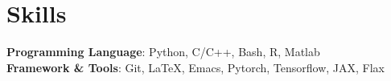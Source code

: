 \documentclass[letterpaper,11pt]{article}
\begin{document}
\section{Skills}
 \begin{itemize}[leftmargin=0.15in, label={}]
    \small{\item{
     \textbf{Programming Language}{: Python, C/C++, Bash, R, Matlab} \\
     \textbf{Framework \& Tools}{: Git, LaTeX, Emacs, Pytorch, Tensorflow, JAX, Flax}
    }}
 \end{itemize}
\end{document}
